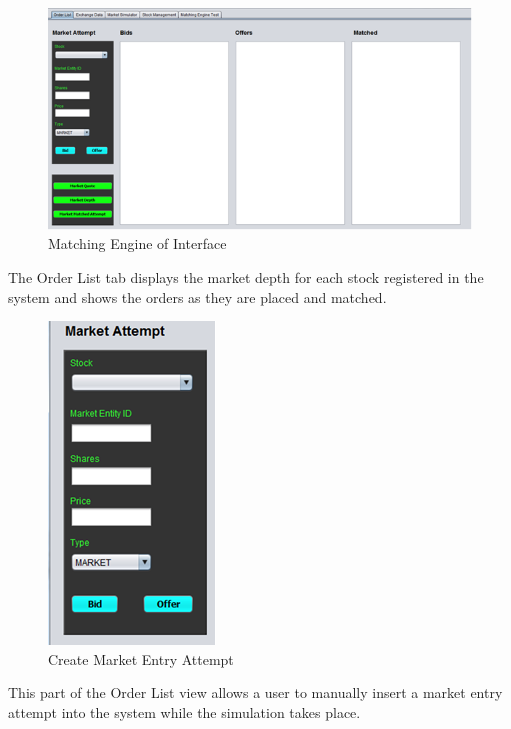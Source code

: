 \documentclass[12pt]{article}
\begin{document}
            \begin{figure}[th]
            \centering
            \includegraphics[scale=0.8]{./matchingengine}
            \caption{Matching Engine of Interface}
            \label{Matching Engine}
            \end{figure}
            The Order List tab displays the market depth for each stock registered in the system and shows the orders as they are placed and matched.
          \pagebreak
\begin{figure}[h!]
\centering
\includegraphics[scale=0.8]{./marketentryattempt}
\caption{Create Market Entry Attempt}
\label{Market Entry Attempt}
\end{figure}  
         
 This part of the Order List view allows a user to manually insert a market entry attempt into the system while the simulation takes place. 
           
\end{document}
